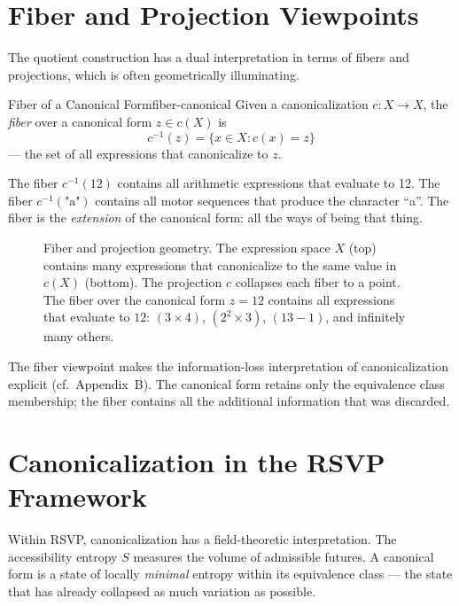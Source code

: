 \section{Fiber and Projection Viewpoints}

The quotient construction has a dual interpretation in terms of fibers
and projections, which is often geometrically illuminating.

\begin{definition}{Fiber of a Canonical Form}{fiber-canonical}
  Given a canonicalization $c : X \to X$, the \emph{fiber} over a
  canonical form $z \in c(X)$ is
  \[
    c^{-1}(z) = \{x \in X : c(x) = z\}
  \]
  — the set of all expressions that canonicalize to $z$.
\end{definition}

The fiber $c^{-1}(12)$ contains all arithmetic expressions that evaluate
to 12. The fiber $c^{-1}(\text{"a"})$ contains all motor sequences that
produce the character ``a''. The fiber is the \emph{extension} of the
canonical form: all the ways of being that thing.

\begin{figure}[h]
  \centering
  \begin{tikzpicture}[scale=1.0]
    
  \end{tikzpicture}
  \caption{Fiber and projection geometry. The expression space $X$ (top)
    contains many expressions that canonicalize to the same value in $c(X)$
    (bottom). The projection $c$ collapses each fiber to a point.
    The fiber over the canonical form $z = 12$ contains all expressions
    that evaluate to $12$: $(3 \times 4)$, $(2^2 \times 3)$, $(13-1)$,
    and infinitely many others.}
  \label{fig:fiber-projection}
\end{figure}

The fiber viewpoint makes the information-loss interpretation of
canonicalization explicit (cf.\  Appendix~B). The canonical form retains
only the equivalence class membership; the fiber contains all the
additional information that was discarded.

\section{Canonicalization in the RSVP Framework}

Within RSVP, canonicalization has a field-theoretic interpretation. The
accessibility entropy $S$ measures the volume of admissible futures.
A canonical form is a state of locally \emph{minimal} entropy within
its equivalence class — the state that has already collapsed as much
variation as possible.

